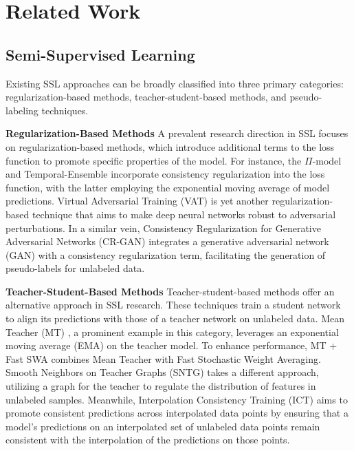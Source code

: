 \section{Related Work}
\subsection{Semi-Supervised Learning}
Existing SSL approaches can be broadly classified into three primary categories: 
regularization-based methods, teacher-student-based methods, and pseudo-labeling techniques.


\textbf{Regularization-Based Methods} 
A prevalent research direction in SSL focuses on regularization-based methods, which introduce additional terms to the loss function to promote specific properties of the model. For instance, the $\Pi$-model \cite{laine2017temporal} and Temporal-Ensemble \cite{laine2017temporal} incorporate consistency regularization into the loss function, with the latter employing the exponential moving average of model predictions. Virtual Adversarial Training (VAT) \cite{miyato2018virtual} is yet another regularization-based technique that aims to make deep neural networks robust to adversarial perturbations. In a similar vein, Consistency Regularization for Generative Adversarial Networks (CR-GAN) \cite{zhang2020consistency} integrates a generative adversarial network (GAN) with a consistency regularization term, facilitating the generation of pseudo-labels for unlabeled data.

\textbf{Teacher-Student-Based Methods} 
Teacher-student-based methods offer an alternative approach in SSL research. These techniques train a student network to align its predictions with those of a teacher network on unlabeled data. 
Mean Teacher (MT) \cite{tarvainen2017mean}, a prominent example in this category, leverages an exponential moving average (EMA) on the teacher model. To enhance performance, MT + Fast SWA \cite{athiwaratkun2019there} combines Mean Teacher with Fast Stochastic Weight Averaging. Smooth Neighbors on Teacher Graphs (SNTG) \cite{luo2018smooth} takes a different approach, utilizing a graph for the teacher to regulate the distribution of features in unlabeled samples. Meanwhile, Interpolation Consistency Training (ICT) \cite{verma2022interpolation} aims to promote consistent predictions across interpolated data points by ensuring that a model's predictions on an interpolated set of unlabeled data points remain consistent with the interpolation of the predictions on those points.

